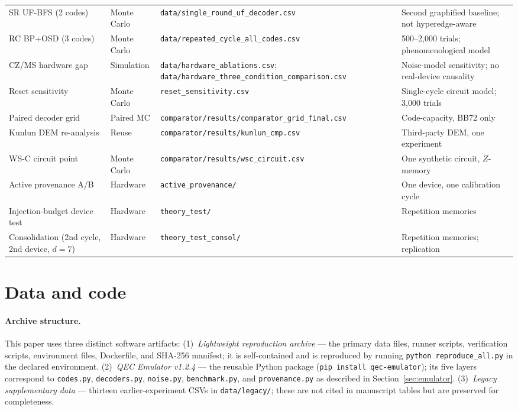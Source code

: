 \documentclass[11pt,a4paper]{article}
\begin{document}
\begin{table}[H]
\begin{tabularx}{\textwidth}{@{}p{3.1cm}p{1.7cm}X p{2.9cm}@{}}
SR UF-BFS (2 codes) & Monte Carlo & \texttt{data/single\_round\_uf\_decoder.csv} & Second graphified baseline; not hyperedge-aware \\
RC BP+OSD (3 codes) & Monte Carlo & \texttt{data/repeated\_cycle\_all\_codes.csv} & 500--2,000 trials; phenomenological model \\
CZ/MS hardware gap & Simulation & \texttt{data/hardware\_ablations.csv}; \texttt{data/hardware\_three\_condition\_comparison.csv} & Noise-model sensitivity; no real-device causality \\
Reset sensitivity & Monte Carlo & \texttt{reset\_sensitivity.csv} & Single-cycle circuit model; 3,000 trials \\
Paired decoder grid & Paired MC & \texttt{comparator/results/comparator\_grid\_final.csv} & Code-capacity, BB72 only \\
Kunlun DEM re-analysis & Reuse & \texttt{comparator/results/kunlun\_cmp.csv} & Third-party DEM, one experiment \\
WS-C circuit point & Monte Carlo & \texttt{comparator/results/wsc\_circuit.csv} & One synthetic circuit, $Z$-memory \\
Active provenance A/B & Hardware & \texttt{active\_provenance/} & One device, one calibration cycle \\
Injection-budget device test & Hardware & \texttt{theory\_test/} & Repetition memories \\
Consolidation (2nd cycle, 2nd device, $d{=}7$) & Hardware & \texttt{theory\_test\_consol/} & Repetition memories; replication \\
\bottomrule
\end{tabularx}
\end{table}

\section*{Data and code}

\paragraph{Archive structure.}
This paper uses three distinct software artifacts:
(1)~\emph{Lightweight reproduction archive} --- the primary data files, runner scripts, verification scripts, environment files, Dockerfile, and SHA-256 manifest; it is self-contained and is reproduced by running \texttt{python reproduce\_all.py} in the declared environment.
(2)~\emph{QEC Emulator v1.2.4} --- the reusable Python package (\texttt{pip install qec-emulator});
its five layers correspond to \texttt{codes.py}, \texttt{decoders.py}, \texttt{noise.py},
\texttt{benchmark.py}, and \texttt{provenance.py} as described in Section~\ref{sec:emulator}.
(3)~\emph{Legacy supplementary data} --- thirteen earlier-experiment CSVs
in \texttt{data/legacy/}; these are not cited in manuscript tables but are
preserved for completeness.
\end{document}
